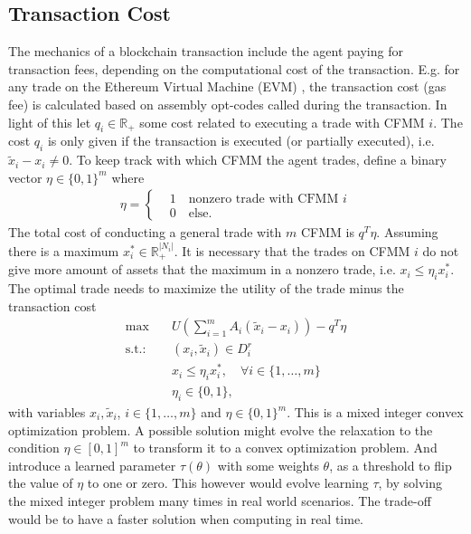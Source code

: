 \subsection{Transaction Cost}
The mechanics of a blockchain transaction include the agent paying for
transaction fees, depending on the computational cost of the transaction.
E.g. for any trade on the Ethereum Virtual Machine (EVM) \cite{evm_optcodes},
the transaction cost (gas fee) is calculated based on assembly opt-codes
called during the transaction. In light of this let $q_i \in \mathbb{R}_+$
some cost related to executing a trade with CFMM $i$. The cost $q_i$ is only
given if the transaction is executed (or partially executed), i.e. $\tilde{x}_i -
x_i \neq 0$. To keep track with which CFMM the agent trades, define a binary
vector $\eta \in \{0, 1\}^{m} $ where
\begin{align}
    \eta =
    \begin{cases}
        &1\quad \text{nonzero trade with CFMM $i$} \\
        &0\quad \text{else}.
    \end{cases}
\end{align}
The total cost of conducting a general trade with $m$ CFMM is $q^{T}\eta$.
Assuming there is a maximum $x_i^{*} \in \mathbb{R}_+^{|N_i|}$. It is
necessary that the trades on CFMM $i$ do not give more amount of assets that
the maximum in a nonzero trade, i.e. $x_i \le \eta_ix_i^{*}$. The optimal
trade needs to maximize the utility of the trade minus the transaction cost
\begin{align}
    \text{max} \quad &U\left(\sum_{i=1}^{m} A_i(\tilde{x}_i-x_i)\right) - q^{T}\eta  \label{eq: trade_transaction_cost}\\
    \text{s.t.:}\quad & (x_i, \tilde{x}_i) \in D_i^{r}\\
          &x_i \le \eta_i x_i^{*}, \quad \forall i \in\{1,\ldots,m\} \\
          &\eta_i \in \{0, 1\},
\end{align}
with variables $x_i, \tilde{x}_i$, $i\in\{1,\ldots,m\}$ and $\eta \in
\{0,1\}^{m} $. This is a mixed integer convex optimization problem. A
possible solution might evolve the relaxation to the condition $\eta \in [0,
1]^{m}$ to transform it to a convex optimization problem. And introduce a
learned parameter $\tau(\theta)$ with some weights $\theta$, as a threshold
to flip the value of $\eta$ to one or zero. This however would evolve
learning $\tau$, by solving the mixed integer problem many times in real
world scenarios. The trade-off would be to have a faster solution when
computing in real time.
